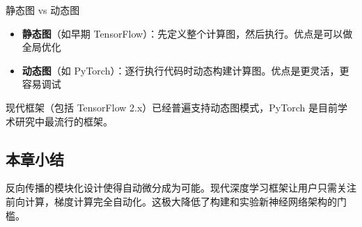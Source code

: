 \begin{knowledgebox}{静态图 vs 动态图}
\begin{itemize}
    \item \textbf{静态图}（如早期 TensorFlow）：先定义整个计算图，然后执行。优点是可以做全局优化
    \item \textbf{动态图}（如 PyTorch）：逐行执行代码时动态构建计算图。优点是更灵活，更容易调试
\end{itemize}
现代框架（包括 TensorFlow 2.x）已经普遍支持动态图模式，PyTorch 是目前学术研究中最流行的框架。
\end{knowledgebox}

\subsection{本章小结}

反向传播的模块化设计使得自动微分成为可能。现代深度学习框架让用户只需关注前向计算，梯度计算完全自动化。这极大降低了构建和实验新神经网络架构的门槛。


